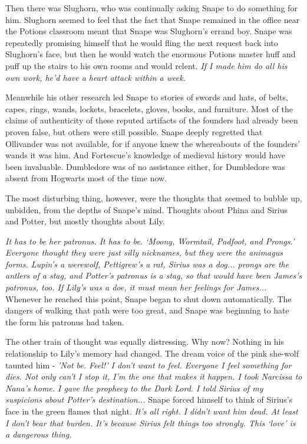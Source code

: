 \documentclass[a4paper,11pt]{article}
\begin{document}
Then there was Slughorn, who was continually asking Snape to do something for him. Slughorn seemed to feel that the fact that Snape remained in the office near the Potions classroom meant that Snape was Slughorn's errand boy. Snape was repeatedly promising himself that he would fling the next request back into Slughorn's face, but then he would watch the enormous Potions master huff and puff up the stairs to his own rooms and would relent. \emph{If I made him do all his own work, he'd have a heart attack within a week.}

Meanwhile his other research led Snape to stories of swords and hats, of belts, capes, rings, wands, lockets, bracelets, gloves, books, and furniture. Most of the claims of authenticity of these reputed artifacts of the founders had already been proven false, but others were still possible. Snape deeply regretted that Ollivander was not available, for if anyone knew the whereabouts of the founders' wands it was him. And Fortescue's knowledge of medieval history would have been invaluable. Dumbledore was of no assistance either, for Dumbledore was absent from Hogwarts most of the time now.

The most disturbing thing, however, were the thoughts that seemed to bubble up, unbidden, from the depths of Snape's mind. Thoughts about Phina and Sirius and Potter, but mostly thoughts about Lily.

\emph{It has to be her patronus. It has to be. `Moony, Wormtail, Padfoot, and Prongs.' Everyone thought they were just silly nicknames, but they were the animagus forms. Lupin's a werewolf, Pettigrew's a rat, Sirius was a dog... prongs are the antlers of a stag, and Potter's patronus is a stag, so that would have been James's patronus, too. If Lily's was a doe, it must mean her feelings for James...} Whenever he reached this point, Snape began to shut down automatically. The dangers of walking that path were too great, and Snape was beginning to hate the form his patronus had taken.

The other train of thought was equally distressing. Why now? Nothing in his relationship to Lily's memory had changed. The dream voice of the pink she-wolf taunted him - \emph{'Not be. Feel!' I don't want to feel. Everyone I feel something for dies. Not only can't I stop it, I'm the one that makes it happen. I took Narcissa to Nana's home. I gave the prophecy to the Dark Lord. I told Sirius of my suspicions about Potter's destination...} Snape forced himself to think of Sirius's face in the green flames that night. \emph{It's all right. I didn't want him dead. At least I don't bear that burden. It's because Sirius felt things too strongly. This `love' is a dangerous thing.}
\end{document}
